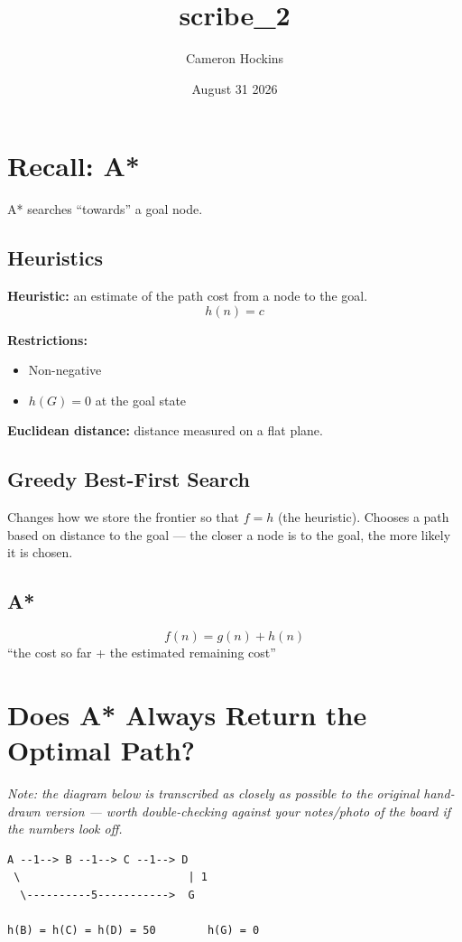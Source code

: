 \documentclass{article}
\title{scribe\_2}
\author{Cameron Hockins}
\date{August 31 2026}
\begin{document}
\maketitle

\section{Recall: A*}

A* searches ``towards'' a goal node.

\subsection{Heuristics}

\textbf{Heuristic:} an estimate of the path cost from a node to the goal.
\[
h(n) = c
\]

\textbf{Restrictions:}
\begin{itemize}[noitemsep]
    \item Non-negative
    \item $h(G) = 0$ at the goal state
\end{itemize}

\textbf{Euclidean distance:} distance measured on a flat plane.

\subsection{Greedy Best-First Search}

Changes how we store the frontier so that $f = h$ (the heuristic). Chooses a path based on distance to the goal --- the closer a node is to the goal, the more likely it is chosen.

\subsection{A*}

\[
f(n) = g(n) + h(n)
\]
``the cost so far + the estimated remaining cost''

\section{Does A* Always Return the Optimal Path?}

\textit{Note: the diagram below is transcribed as closely as possible to the original hand-drawn version --- worth double-checking against your notes/photo of the board if the numbers look off.}

\begin{verbatim}
A --1--> B --1--> C --1--> D
 \                          | 1
  \----------5----------->  G

h(B) = h(C) = h(D) = 50        h(G) = 0
\end{verbatim}
\end{document}
